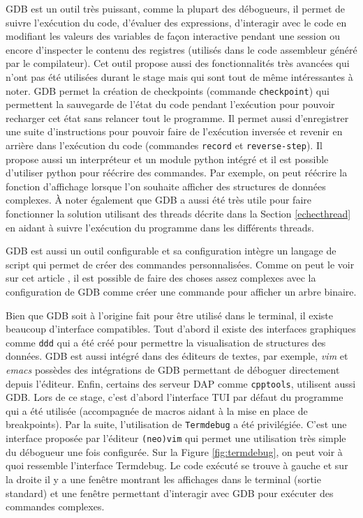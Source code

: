\documentclass[a4paper]{article}
\begin{document}
GDB est un outil très puissant, comme la plupart des débogueurs, il permet de
suivre l'exécution du code, d'évaluer des expressions, d'interagir avec le code
en modifiant les valeurs des variables de façon interactive pendant une session
ou encore d'inspecter le contenu des registres (utilisés dans le code assembleur
généré par le compilateur). Cet outil propose aussi des fonctionnalités très
avancées qui n'ont pas été utilisées durant le stage mais qui sont tout de même
intéressantes à noter. GDB permet la création de checkpoints (commande
\verb|checkpoint|) qui permettent la sauvegarde de l'état du code pendant
l'exécution pour pouvoir recharger cet état sans relancer tout le programme. Il
permet aussi d'enregistrer une suite d'instructions pour pouvoir faire de
l'exécution inversée et revenir en arrière dans l'exécution du code (commandes
\verb|record| et \verb|reverse-step|). Il propose aussi un interpréteur et un
module python intégré et il est possible d'utiliser python pour réécrire des
commandes. Par exemple, on peut réécrire la fonction d'affichage lorsque l'on
souhaite afficher des structures de données complexes. À noter également que GDB
a aussi été très utile pour faire fonctionner la solution utilisant des threads
décrite dans la Section \ref{echecthread} en aidant à suivre l'exécution du
programme dans les différents threads.

GDB est aussi un outil configurable et sa configuration intègre un langage de
script qui permet de créer des commandes personnalisées. Comme on peut le voir
sur cet article \cite{gdbinit}, il est possible de faire des choses assez
complexes avec la configuration de GDB comme créer une commande pour afficher un
arbre binaire.

Bien que GDB soit à l'origine fait pour être utilisé dans le terminal, il existe
beaucoup d'interface compatibles. Tout d'abord il existe des interfaces
graphiques comme \verb|ddd| qui a été créé pour permettre la visualisation de
structures des données. GDB est aussi intégré dans des éditeurs de textes, par
exemple, \textit{vim} et \textit{emacs} possèdes des intégrations de GDB
permettant de déboguer directement depuis l'éditeur. Enfin, certains des serveur
DAP comme \verb|cpptools|, utilisent aussi GDB. Lors de ce stage, c'est d'abord
l'interface TUI par défaut du programme qui a été utilisée (accompagnée de
macros aidant à la mise en place de breakpoints). Par la suite, l'utilisation de
\verb|Termdebug| a été privilégiée. C'est une interface proposée par l'éditeur
\verb|(neo)vim| qui permet une utilisation très simple du débogueur une fois
configurée. Sur la Figure \ref{fig:termdebug}, on peut voir à quoi ressemble
l'interface Termdebug. Le code exécuté se trouve à gauche et sur la droite il y
a une fenêtre montrant les affichages dans le terminal (sortie standard) et une
fenêtre permettant d'interagir avec GDB pour exécuter des commandes complexes.
\end{document}
